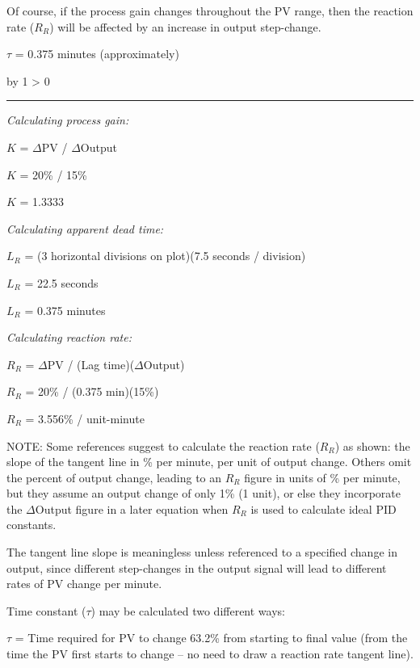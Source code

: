 \documentclass[12pt,a4paper]{article}
\def\notes{
           \advance\explnum by 1
           \ifnum \explnum > 0
                \hrule
                \vskip 3pt
                \leftline{Notes \the\explnum}
                \vskip 3pt \fi}
\begin{document}
Of course, if the process gain changes throughout the PV range, then the reaction rate ($R_R$) will be affected by an increase in output step-change.

\vskip 10pt

$\tau$ = 0.375 minutes (approximately)

\vskip 10pt \filbreak 





\notes{} 

{\it Calculating process gain:}

$K$ = $\Delta$PV / $\Delta$Output

$K$ = 20\% / 15\%

$K$ = 1.3333
 
\vskip 10pt

{\it Calculating apparent dead time:}

$L_R$ = (3 horizontal divisions on plot)(7.5 seconds / division)

$L_R$ = 22.5 seconds

$L_R$ = 0.375 minutes
 
\vskip 10pt
 
{\it Calculating reaction rate:}

$R_R$ = $\Delta$PV / (Lag time)($\Delta$Output)

$R_R$ = 20\% / (0.375 min)(15\%)

$R_R$ = 3.556\% / unit-minute
 
\vskip 10pt
 
NOTE: Some references suggest to calculate the reaction rate ($R_R$) as shown: the slope of the tangent line in \% per minute, per unit of output change.  Others omit the percent of output change, leading to an $R_R$ figure in units of \% per minute, but they assume an output change of only 1\% (1 unit), or else they incorporate the $\Delta$Output figure in a later equation when $R_R$ is used to calculate ideal PID constants.  

The tangent line slope is meaningless unless referenced to a specified change in output, since different step-changes in the output signal will lead to different rates of PV change per minute.

\vskip 10pt


Time constant ($\tau$) may be calculated two different ways:
 
\vskip 10pt

$\tau$ = Time required for PV to change 63.2\% from starting to final value (from the time the PV first starts to change -- no need to draw a reaction rate tangent line).
 
\end{document}
